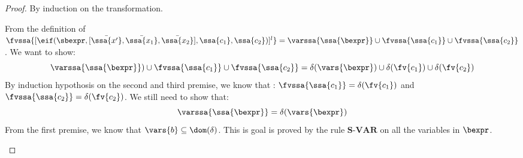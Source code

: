 \begin{proof}
 By induction on the transformation.
 \begin{itemize}
From the definition of $\fvssa{[\eif(\sbexpr, [\bar{\ssa{x'}}, \bar{\ssa{x_1}}, \bar{\ssa{x_2}}] , \ssa{c_1}, \ssa{c_2})]^l} = \varssa{\ssa{\bexpr}} \cup \fvssa{\ssa{c_1}} \cup \fvssa{\ssa{c_2}}$. We want to show: \[\varssa{\ssa{\bexpr}}) \cup \fvssa{\ssa{c_1}} \cup \fvssa{\ssa{c_2}} = \delta( \vars{\bexpr}) \cup \delta(\fv{c_1}) \cup \delta(\fv{c_2}  )\]
By induction hypothosis on the second and third premise, we know that : $\fvssa{\ssa{c_1}} = \delta(\fv{c_1}) $ and $\fvssa{\ssa{c_2}} = \delta(\fv{c_2}) $.  We still need to show that: 
\[
  \varssa{\ssa{\bexpr}} = \delta(\vars{\bexpr})
\] 
From the first premise, we know that $\vars{b} \subseteq \dom(\delta)$. This is goal is proved by the rule $\textbf{S-VAR}$ on all the variables in $\bexpr$.\\
{}
\end{itemize}
\end{proof}
